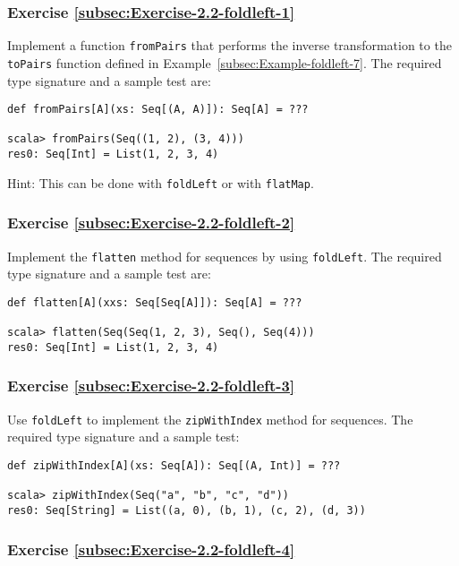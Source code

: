 \subsubsection{Exercise \label{subsec:Exercise-2.2-foldleft-1}\ref{subsec:Exercise-2.2-foldleft-1}}

Implement a function \lstinline!fromPairs! that performs the inverse
transformation to the \lstinline!toPairs! function defined in Example~\ref{subsec:Example-foldleft-7}.
The required type signature and a sample test are:
\begin{lstlisting}
def fromPairs[A](xs: Seq[(A, A)]): Seq[A] = ???

scala> fromPairs(Seq((1, 2), (3, 4)))
res0: Seq[Int] = List(1, 2, 3, 4)
\end{lstlisting}

Hint: This can be done with \lstinline!foldLeft! or with \lstinline!flatMap!.

\subsubsection{Exercise \label{subsec:Exercise-2.2-foldleft-2}\ref{subsec:Exercise-2.2-foldleft-2}}

Implement the \lstinline!flatten! method for sequences by using \lstinline!foldLeft!.
The required type signature and a sample test are:
\begin{lstlisting}
def flatten[A](xxs: Seq[Seq[A]]): Seq[A] = ???

scala> flatten(Seq(Seq(1, 2, 3), Seq(), Seq(4)))
res0: Seq[Int] = List(1, 2, 3, 4)
\end{lstlisting}


\subsubsection{Exercise \label{subsec:Exercise-2.2-foldleft-3}\ref{subsec:Exercise-2.2-foldleft-3}}

Use \lstinline!foldLeft! to implement the \lstinline!zipWithIndex!
method for sequences. The required type signature and a sample test:
\begin{lstlisting}
def zipWithIndex[A](xs: Seq[A]): Seq[(A, Int)] = ???

scala> zipWithIndex(Seq("a", "b", "c", "d"))
res0: Seq[String] = List((a, 0), (b, 1), (c, 2), (d, 3))
\end{lstlisting}


\subsubsection{Exercise \label{subsec:Exercise-2.2-foldleft-4}\ref{subsec:Exercise-2.2-foldleft-4}}

